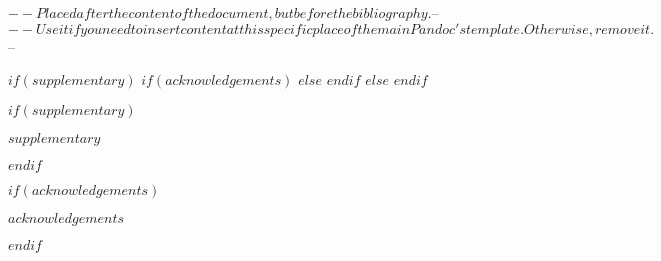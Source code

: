 $-- Placed after the content of the document, but before the bibliography.
$-- %
$-- Use it if you need to insert content at this specific place of the main Pandoc's template. Otherwise, remove it.
$-- %

$if(supplementary)$
$if(acknowledgements)$
\backmatter
$else$
\backmatter
$endif$
$else$
\backmatter
$endif$

$if(supplementary)$

$supplementary$

$endif$

$if(acknowledgements)$

$acknowledgements$

$endif$